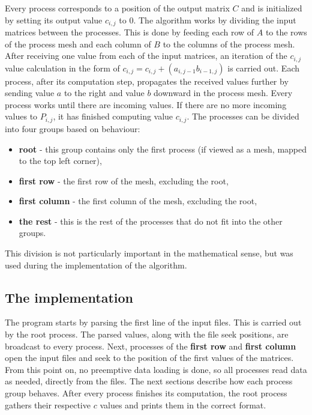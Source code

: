 \documentclass[pdftex, 11pt, a4paper, titlepage]{article}
\begin{document}
    Every process corresponds to a position of the output matrix $C$ and is initialized
    by setting its output value $c_{i,j}$ to $0$.
    The algorithm works by dividing the input matrices between the processes. This is
    done by feeding each row of $A$ to the rows of the process mesh and
    each column of $B$ to the columns of the process mesh. After receiving one value
    from each of the input matrices, an iteration of the $c_{i,j}$ value calculation
    in the form of $c_{i,j} = c_{i,j} + (a_{i,j-1} b_{i-1,j})$ is carried out.
    Each process, after its computation step, propagates the received values further
    by sending value $a$ to the right and value $b$ downward in the process mesh.
    Every process works until there are incoming values. If there are no more incoming
    values to $P_{i,j}$, it has finished computing value $c_{i,j}$.
    The processes can be divided into four groups based on behaviour:
    \begin{itemize}
        \item \textbf{root} - this group contains only the first process (if viewed as a mesh,
                mapped to the top left corner),
        \item \textbf{first row} - the first row of the mesh, excluding the root,
        \item \textbf{first column} - the first column of the mesh, excluding the root,
        \item \textbf{the rest} - this is the rest of the processes that do not fit into the
                other groups.
    \end{itemize}
    This division is not particularly important in the mathematical sense, but was
    used during the implementation of the algorithm.

    \subsection{The implementation}
    The program starts by parsing the first line of the input files. This is carried out
    by the root process. The parsed values, along with the file seek positions, are broadcast
    to every process. Next, processes of the \textbf{first row} and \textbf{first column}
    open the input files and seek to the position of the first values of the matrices.
    From this point on, no preemptive data loading is done, so all processes read data
    as needed, directly from the files. The next sections describe how each process
    group behaves. After every process finishes its computation, the root process
    gathers their respective $c$ values and prints them in the correct format.
\end{document}
